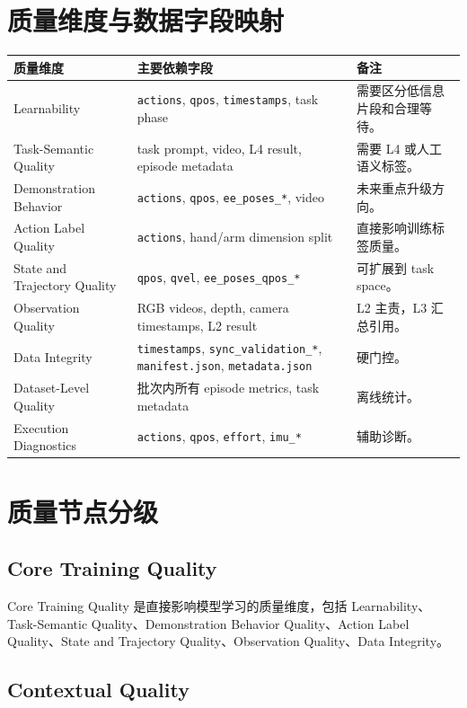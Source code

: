 \documentclass[UTF8,zihao=-4]{ctexart}
\newcommand{\Code}[1]{\texttt{#1}}
\begin{document}
\section{质量维度与数据字段映射}

\begin{longtable}{L{3.4cm} L{6.1cm} L{4.5cm}}
\toprule
质量维度 & 主要依赖字段 & 备注 \\
\midrule
Learnability & \Code{actions}, \Code{qpos}, \Code{timestamps}, task phase & 需要区分低信息片段和合理等待。 \\
Task-Semantic Quality & task prompt, video, L4 result, episode metadata & 需要 L4 或人工语义标签。 \\
Demonstration Behavior & \Code{actions}, \Code{qpos}, \Code{ee\_poses\_*}, video & 未来重点升级方向。 \\
Action Label Quality & \Code{actions}, hand/arm dimension split & 直接影响训练标签质量。 \\
State and Trajectory Quality & \Code{qpos}, \Code{qvel}, \Code{ee\_poses\_qpos\_*} & 可扩展到 task space。 \\
Observation Quality & RGB videos, depth, camera timestamps, L2 result & L2 主责，L3 汇总引用。 \\
Data Integrity & \Code{timestamps}, \Code{sync\_validation\_*}, \Code{manifest.json}, \Code{metadata.json} & 硬门控。 \\
Dataset-Level Quality & 批次内所有 episode metrics, task metadata & 离线统计。 \\
Execution Diagnostics & \Code{actions}, \Code{qpos}, \Code{effort}, \Code{imu\_*} & 辅助诊断。 \\
\bottomrule
\end{longtable}

\section{质量节点分级}

\subsection{Core Training Quality}

Core Training Quality 是直接影响模型学习的质量维度，包括 Learnability、Task-Semantic Quality、Demonstration Behavior Quality、Action Label Quality、State and Trajectory Quality、Observation Quality、Data Integrity。

\subsection{Contextual Quality}
\end{document}
